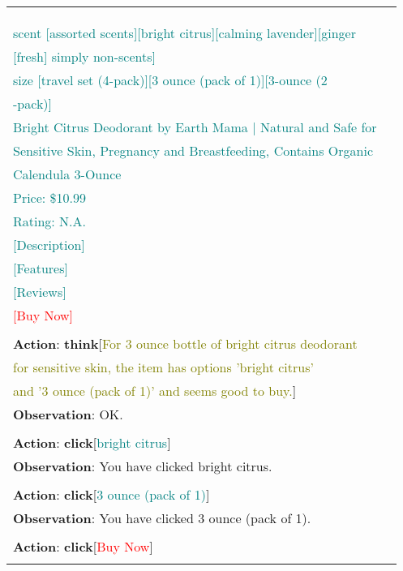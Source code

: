 \begin{table}[H]
\begin{tabular}{l|l}
{\textbf{Observation}:\\
\textcolor{red}{} \\
\textcolor{red}{} \\
\textcolor{teal}{scent [assorted scents][bright citrus][calming lavender][ginger}\\ \textcolor{teal}{[fresh] simply non-scents]}\\
\textcolor{teal}{size [travel set (4-pack)][3 ounce (pack of 1)][3-ounce (2}\\ \textcolor{teal}{-pack)]}\\
\textcolor{teal}{Bright Citrus Deodorant by Earth Mama | Natural and Safe for }\\
\textcolor{teal}{  Sensitive Skin, Pregnancy and Breastfeeding, Contains Organic }\\
\textcolor{teal}{  Calendula 3-Ounce }\\
\textcolor{teal}{Price: \$10.99}\\
\textcolor{teal}{Rating: N.A.}\\
\textcolor{teal}{[Description]}\\
\textcolor{teal}{[Features]}\\
\textcolor{teal}{[Reviews]}\\
\textcolor{red}{[Buy Now]}\\
\\
\textbf{Action}: \textbf{think}[\textcolor{olive}{For 3 ounce bottle of bright citrus deodorant}\\ \textcolor{olive}{for sensitive skin, the item has options 'bright citrus'}\\ \textcolor{olive}{and '3 ounce (pack of 1)' and seems good to buy.}]\\
\textbf{Observation}: OK.\\
\\
\textbf{Action}: \textbf{click}[\textcolor{teal}{bright citrus}]\\
\textbf{Observation}: You have clicked bright citrus.\\
\\
\textbf{Action}: \textbf{click}[\textcolor{teal}{3 ounce (pack of 1)}]\\
\textbf{Observation}: You have clicked 3 ounce (pack of 1).\\
\\
\textbf{Action}: \textbf{click}[\textcolor{red}{Buy Now}]\\
} \\ 

\bottomrule
\end{tabular}
\end{table}


